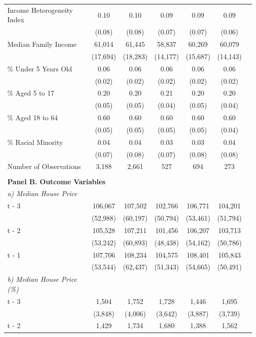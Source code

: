 \begin{longtable}{p{4cm}cccccc}
    Income Heterogeneity Index & 0.10 & 0.10 & 0.09 & 0.09 & 0.09 \\
                               & (0.08) & (0.08) & (0.07) & (0.07) & (0.06) \\
    Median Family Income & 61,014 & 61,445 & 58,837 & 60,269 & 60,079 \\
                         & (17,694) & (18,283) & (14,177) & (15,687) & (14,143) \\
    \% Under 5 Years Old & 0.06 & 0.06 & 0.06 & 0.06 & 0.06 \\
                         & (0.02) & (0.02) & (0.02) & (0.02) & (0.02) \\
    \% Aged 5 to 17 & 0.20 & 0.20 & 0.21 & 0.20 & 0.20 \\
                    & (0.05) & (0.05) & (0.04) & (0.05) & (0.04) \\
    \% Aged 18 to 64 & 0.60 & 0.60 & 0.60 & 0.60 & 0.60 \\
                     & (0.05) & (0.05) & (0.05) & (0.05) & (0.04) \\
    \% Racial Minority & 0.04 & 0.04 & 0.03 & 0.03 & 0.04 \\
                       & (0.07) & (0.08) & (0.07) & (0.08) & (0.08) \\
    Number of Observations & 3,188 & 2,661 & 527 & 694 & 273 \\
    \\
    \multicolumn{6}{l}{\textbf{Panel B. Outcome Variables}} \\
    \textit{a) Median House Price} & & & & & \\
    t - 3 & 106,067 & 107,502 & 102,766 & 106,771 & 104,201 \\
          & (52,988) & (60,197) & (50,794) & (53,461) & (51,794) \\
    t - 2 & 105,528 & 107,211 & 101,456 & 106,207 & 103,713 \\
          & (53,242) & (60,893) & (48,438) & (54,162) & (50,786) \\
    t - 1 & 107,706 & 108,234 & 104,575 & 108,401 & 105,843 \\
          & (53,544) & (62,437) & (51,343) & (54,665) & (50,491) \\
    \textit{b) Median House Price (\%)} & & & & & \\
    t - 3 & 1,504 & 1,752 & 1,728 & 1,446 & 1,695 \\
          & (3,848) & (4,006) & (3,642) & (3,887) & (3,739) \\
    t - 2 & 1,429 & 1,734 & 1,680 & 1,388 & 1,562 \\

\end{longtable}
